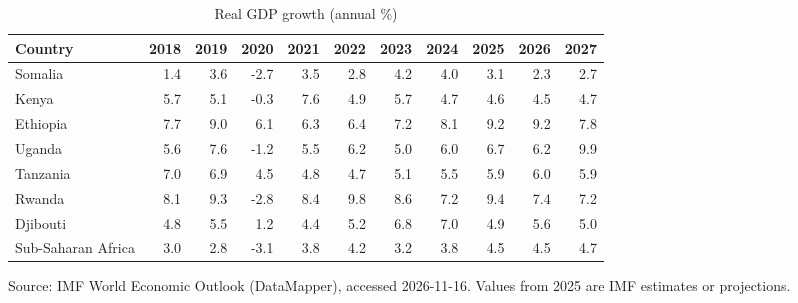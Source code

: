 \begin{table}[htbp]\centering
\caption{Real GDP growth (annual \%)}
\begin{tabular}{lrrrrrrrrrr}
\toprule
Country & 2018 & 2019 & 2020 & 2021 & 2022 & 2023 & 2024 & 2025 & 2026 & 2027 \\
\midrule
Somalia & 1.4 & 3.6 & -2.7 & 3.5 & 2.8 & 4.2 & 4.0 & 3.1 & 2.3 & 2.7 \\
Kenya & 5.7 & 5.1 & -0.3 & 7.6 & 4.9 & 5.7 & 4.7 & 4.6 & 4.5 & 4.7 \\
Ethiopia & 7.7 & 9.0 & 6.1 & 6.3 & 6.4 & 7.2 & 8.1 & 9.2 & 9.2 & 7.8 \\
Uganda & 5.6 & 7.6 & -1.2 & 5.5 & 6.2 & 5.0 & 6.0 & 6.7 & 6.2 & 9.9 \\
Tanzania & 7.0 & 6.9 & 4.5 & 4.8 & 4.7 & 5.1 & 5.5 & 5.9 & 6.0 & 5.9 \\
Rwanda & 8.1 & 9.3 & -2.8 & 8.4 & 9.8 & 8.6 & 7.2 & 9.4 & 7.4 & 7.2 \\
Djibouti & 4.8 & 5.5 & 1.2 & 4.4 & 5.2 & 6.8 & 7.0 & 4.9 & 5.6 & 5.0 \\
Sub-Saharan Africa & 3.0 & 2.8 & -3.1 & 3.8 & 4.2 & 3.2 & 3.8 & 4.5 & 4.5 & 4.7 \\
\bottomrule
\end{tabular}
\par\smallskip\footnotesize Source: IMF World Economic Outlook (DataMapper), accessed 2026-11-16. Values from 2025 are IMF estimates or projections.
\end{table}
